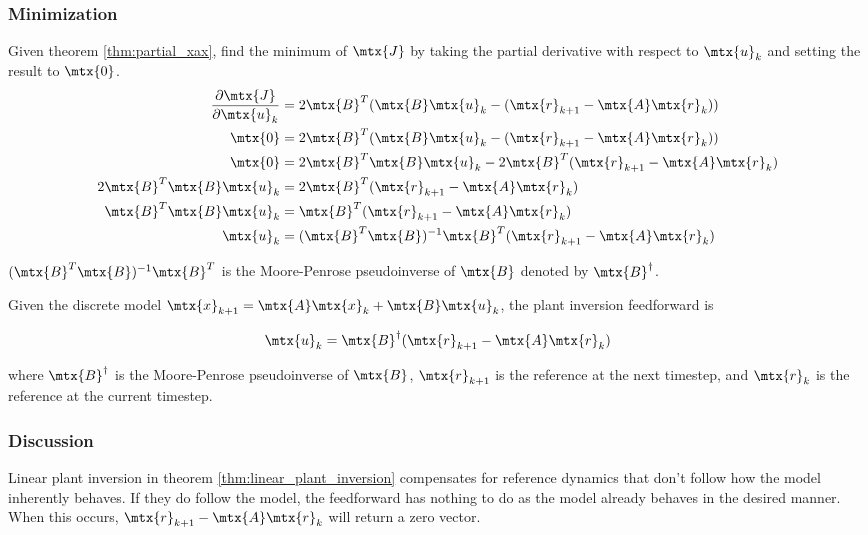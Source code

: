 \subsubsection{Minimization}

Given theorem \ref{thm:partial_xax}, find the minimum of $\mtx{J}$ by taking the
partial derivative with respect to $\mtx{u}_k$ and setting the result to
$\mtx{0}$.
\begin{align*}
  \frac{\partial\mtx{J}}{\partial\mtx{u}_k} &= 2\mtx{B}^T
    (\mtx{B}\mtx{u}_k - (\mtx{r}_{k+1} - \mtx{A}\mtx{r}_k)) \\
  \mtx{0} &= 2\mtx{B}^T
    (\mtx{B}\mtx{u}_k - (\mtx{r}_{k+1} - \mtx{A}\mtx{r}_k)) \\
  \mtx{0} &= 2\mtx{B}^T\mtx{B}\mtx{u}_k -
    2\mtx{B}^T(\mtx{r}_{k+1} - \mtx{A}\mtx{r}_k) \\
  2\mtx{B}^T\mtx{B}\mtx{u}_k &=
    2\mtx{B}^T(\mtx{r}_{k+1} - \mtx{A}\mtx{r}_k) \\
  \mtx{B}^T\mtx{B}\mtx{u}_k &=
    \mtx{B}^T(\mtx{r}_{k+1} - \mtx{A}\mtx{r}_k) \\
  \mtx{u}_k &=
    (\mtx{B}^T\mtx{B})^{-1} \mtx{B}^T(\mtx{r}_{k+1} - \mtx{A}\mtx{r}_k)
\end{align*}

$(\mtx{B}^T\mtx{B})^{-1} \mtx{B}^T$ is the Moore-Penrose pseudoinverse of
$\mtx{B}$ denoted by $\mtx{B}^\dagger$.
\begin{theorem}
  \label{thm:linear_plant_inversion}

  Given the discrete model
  $\mtx{x}_{k+1} = \mtx{A}\mtx{x}_k + \mtx{B}\mtx{u}_k$, the plant inversion
  feedforward is

  \begin{equation}
    \mtx{u}_k = \mtx{B}^\dagger (\mtx{r}_{k+1} - \mtx{A}\mtx{r}_k)
  \end{equation}

  where $\mtx{B}^\dagger$ is the Moore-Penrose pseudoinverse of $\mtx{B}$,
  $\mtx{r}_{k+1}$ is the reference at the next timestep, and $\mtx{r}_k$ is the
  reference at the current timestep.
\end{theorem}

\subsubsection{Discussion}

Linear \gls{plant} inversion in theorem \ref{thm:linear_plant_inversion}
compensates for \gls{reference} dynamics that don't follow how the \gls{model}
inherently behaves. If they do follow the \gls{model}, the feedforward has
nothing to do as the \gls{model} already behaves in the desired manner. When
this occurs, $\mtx{r}_{k+1} - \mtx{A}\mtx{r}_k$ will return a zero vector.

